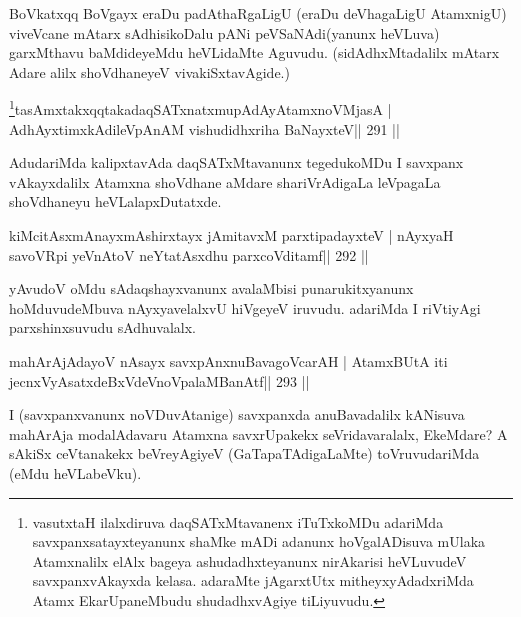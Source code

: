 \begin{artha}
BoVkatxqq BoVgayx eraDu padAthaRgaLigU (eraDu deVhagaLigU AtamxnigU) viveVcane mAtarx sAdhisikoDalu pANi peVSaNAdi(yanunx heVLuva) garxMthavu baMdideyeMdu heVLidaMte Aguvudu. (sidAdhxMtadalilx mAtarx  \mdash  Adare alilx shoVdhaneyeV vivakiSxtavAgide.)
\end{artha}

\begin{shl}
\footnote{vasutxtaH ilalxdiruva daqSATxMtavanenx iTuTxkoMDu 
adariMda savxpanxsatayxteyanunx shaMke mADi adanunx hoVgalADisuva mUlaka Atamxnalilx elAlx bageya ashudadhxteyanunx nirAkarisi heVLuvudeV savxpanxvAkayxda kelasa. adaraMte jAgarxtUtx mitheyxyAdadxriMda Atamx EkarUpaneMbudu shudadhxvAgiye tiLiyuvudu.}tasAmxtakxqqtakadaqSATxnatxmupAdAyA\s\s tamxnoV\s MjasA |
AdhAyxtimxkAdileVpAnAM vishudidhxriha BaNayxteV\hfill || 291 ||
\end{shl}

\begin{artha}
AdudariMda kalipxtavAda daqSATxMtavanunx tegedukoMDu I savxpanx vAkayxdalilx Atamxna shoVdhane aMdare shariVrAdigaLa leVpagaLa shoVdhaneyu heVLalapxDutatxde.
\end{artha}


\begin{shl}
kiMcitAsxmAnayxmAshirxtayx jAmitavxM parxtipadayxteV |
nAyxyaH savoVR\s pi yeVnAtoV neYtatAsxdhu parxcoVditamf\hfill || 292 ||
\end{shl}

\begin{artha}
yAvudoV oMdu sAdaqshayxvanunx avalaMbisi punarukitxyanunx  hoMduvudeMbuva nAyxyavelalxvU hiVgeyeV iruvudu. adariMda I riVtiyAgi parxshinxsuvudu sAdhuvalalx.
\end{artha}


\begin{shl}
mahArAjAdayoV nAsayx savxpAnxnuBavagoVcarAH |
AtamxBUtA iti jecnxVyAsatxdeBxVdeVnoVpalaMBanAtf\hfill || 293 ||
\end{shl}

\begin{artha}
I (savxpanxvanunx noVDuvAtanige) savxpanxda anuBavadalilx kANisuva mahArAja modalAdavaru Atamxna savxrUpakekx seVridavaralalx, EkeMdare? A sAkiSx ceVtanakekx beVreyAgiyeV (GaTapaTAdigaLaMte) toVruvudariMda (eMdu heVLabeVku).
\end{artha}

